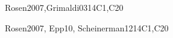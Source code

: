 \begin{syllabus}
    \begin{unit}{\DSBasicLogic}{}{Rosen2007,Grimaldi03}{14}{C1,C20}
    \begin{topics}
        \item \DSBasicLogicTopicPropositional%
        \item \DSBasicLogicTopicLogical%
        \item \DSBasicLogicTopicTruth%
        \item \DSBasicLogicTopicNormal%
        \item \DSBasicLogicTopicValidity%
        \item \DSBasicLogicTopicPropositionalInference%
        \item \DSBasicLogicTopicPredicate%
        \item \DSBasicLogicTopicLimitations%
    \end{topics}
    \begin{learningoutcomes}
    \item \DSBasicLogicLOConvertLogical [\Usage ]
    \item \DSBasicLogicLOApplyFormal [\Usage ]
    \item \DSBasicLogicLOUseThe [\Usage]
    \item \DSBasicLogicLODescribeHowCan [\Familiarity]
    \item \DSBasicLogicLOApplyFormalAnd [\Usage ]
    \item \DSBasicLogicLODescribeTheLimitationsAnd [\Usage]
    \end{learningoutcomes}
    \end{unit}

\begin{unit}{\DSProofTechniques}{}{Rosen2007, Epp10, Scheinerman12}{14}{C1,C20}
\begin{topics}
        \item \DSProofTechniquesTopicNotions%
        \item \DSProofTechniquesTopicThe%
        \item \DSProofTechniquesTopicDirect%
        \item \DSProofTechniquesTopicDisproving%
        \item \DSProofTechniquesTopicProof%
        \item \DSProofTechniquesTopicInduction%
        \item \DSProofTechniquesTopicStructural%
        \item \DSProofTechniquesTopicWeak%
        \item \DSProofTechniquesTopicRecursive%
        \item \DSProofTechniquesTopicWell%
\end{topics}


\end{unit}
\end{syllabus}
